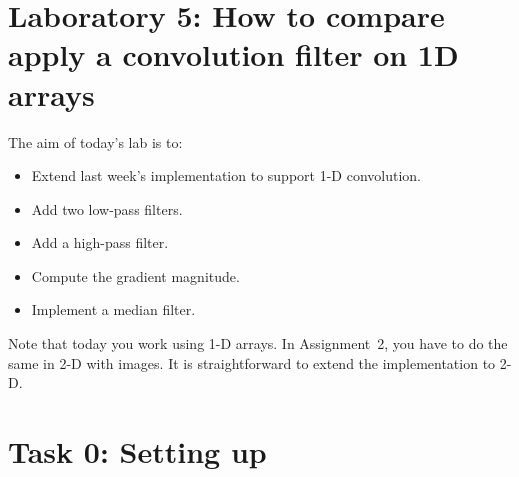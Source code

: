 \documentclass[english,a4paper,12pt,oneside]{article}
\begin{document}

\section*{Laboratory 5: How to compare apply a convolution filter on 1D arrays}

%
%
%
%    
%    

The aim of today's lab is to:
\begin{itemize}
	\item Extend last week's implementation to support 1-D convolution.
	\item Add two low-pass filters.
	\item Add a high-pass filter.
	\item Compute the gradient magnitude.
	\item Implement a median filter.
\end{itemize}

Note that today you work using 1-D arrays. In Assignment~2, you have to do the same in 2-D with images. It is straightforward to extend the implementation to 2-D. 

\section*{Task 0: Setting up}
\end{document}
